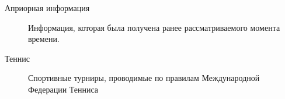 \Defines %
\begin{description}
	
	\item[Априорная информация]  Информация, которая была получена ранее рассматриваемого момента времени\cite{def01}.
	\item[Теннис] Спортивные турниры, проводимые по правилам Международной Федерации Тенниса\cite{Book04}
	
	
\end{description}

